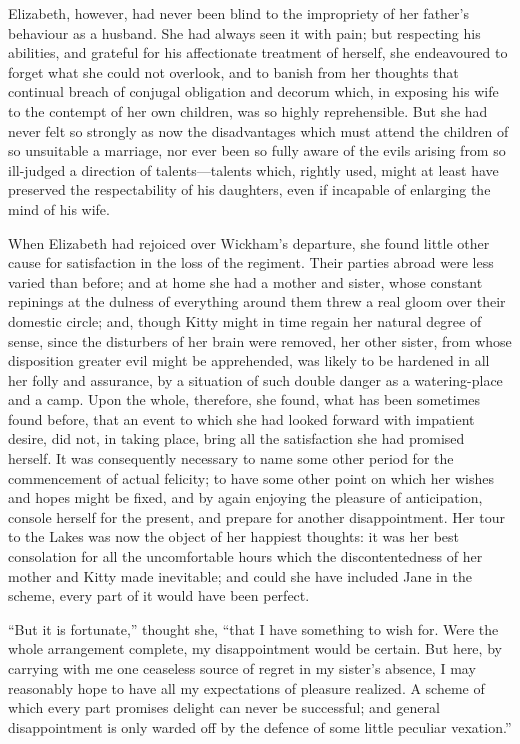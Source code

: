 \documentclass[12pt,openright]{book}
\begin{document}
Elizabeth, however, had never been blind to the impropriety of her father’s behaviour as a husband. She had always seen it with pain; but respecting his abilities, and grateful for his affectionate treatment of herself, she endeavoured to forget what she could not overlook, and to banish from her thoughts that continual breach of conjugal obligation and decorum which, in exposing his wife to the contempt of her own children, was so highly reprehensible. But she had never felt so strongly as now the disadvantages which must attend the children of so unsuitable a marriage, nor ever been so fully aware of the evils arising from so ill-judged a direction of talents—talents which, rightly used, might at least have preserved the respectability of his daughters, even if incapable of enlarging the mind of his wife.

When Elizabeth had rejoiced over Wickham’s departure, she found little other cause for satisfaction in the loss of the regiment. Their parties abroad were less varied than before; and at home she had a mother and sister, whose constant repinings at the dulness of everything around them threw a real gloom over their domestic circle; and, though Kitty might in time regain her natural degree of sense, since the disturbers of her brain were removed, her other sister, from whose disposition greater evil might be apprehended, was likely to be hardened in all her folly and assurance, by a situation of such double danger as a watering-place and a camp. Upon the whole, therefore, she found, what has been sometimes found before, that an event to which she had looked forward with impatient desire, did not, in taking place, bring all the satisfaction she had promised herself. It was consequently necessary to name some other period for the commencement of actual felicity; to have some other point on which her wishes and hopes might be fixed, and by again enjoying the pleasure of anticipation, console herself for the present, and prepare for another disappointment. Her tour to the Lakes was now the object of her happiest thoughts: it was her best consolation for all the uncomfortable hours which the discontentedness of her mother and Kitty made inevitable; and could she have included Jane in the scheme, every part of it would have been perfect.

“But it is fortunate,” thought she, “that I have something to wish for. Were the whole arrangement complete, my disappointment would be certain. But here, by carrying with me one ceaseless source of regret in my sister’s absence, I may reasonably hope to have all my expectations of pleasure realized. A scheme of which every part promises delight can never be successful; and general disappointment is only warded off by the defence of some little peculiar vexation.”
\end{document}
